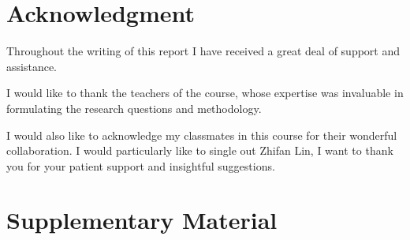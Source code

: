 \section{Acknowledgment}

Throughout the writing of this report I have received a great deal of support and assistance.

I would like to thank the teachers of the course, whose expertise was invaluable in formulating the research questions and methodology. 

I would also like to acknowledge my classmates in this course for their wonderful collaboration. I would particularly like to single out Zhifan Lin, I want to thank you for your patient support and insightful suggestions.

\section*{Supplementary Material}

